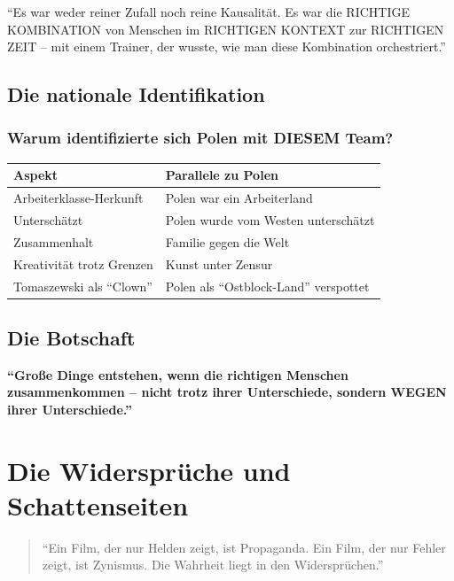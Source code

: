 \documentclass[11pt,a4paper]{book}
\newenvironment{thesenbox}{%
  \begin{mdframed}[
    linecolor=polishred,
    linewidth=2pt,
    backgroundcolor=polishred!5,
    innertopmargin=15pt,
    innerbottommargin=15pt
  ]
  \centering\large\itshape
}{%
  \end{mdframed}
}
\newenvironment{kontextbox}{%
  \begin{mdframed}[
    linecolor=polishred,
    linewidth=1pt,
    backgroundcolor=white,
    leftmargin=20pt,
    rightmargin=20pt
  ]
}{%
  \end{mdframed}
}
\begin{document}
\begin{thesenbox}
``Es war weder reiner Zufall noch reine Kausalität. Es war die RICHTIGE KOMBINATION von Menschen im RICHTIGEN KONTEXT zur RICHTIGEN ZEIT -- mit einem Trainer, der wusste, wie man diese Kombination orchestriert.''
\end{thesenbox}

\section{Die nationale Identifikation}

\subsection{Warum identifizierte sich Polen mit DIESEM Team?}

\begin{longtable}{L{4cm}L{9cm}}
\toprule
\textbf{Aspekt} & \textbf{Parallele zu Polen} \\
\midrule
\endhead
Arbeiterklasse-Herkunft & Polen war ein Arbeiterland \\
Unterschätzt & Polen wurde vom Westen unterschätzt \\
Zusammenhalt & Familie gegen die Welt \\
Kreativität trotz Grenzen & Kunst unter Zensur \\
Tomaszewski als ``Clown'' & Polen als ``Ostblock-Land'' verspottet \\
\bottomrule
\end{longtable}

\section{Die Botschaft}

\begin{kontextbox}
\textbf{``Große Dinge entstehen, wenn die richtigen Menschen zusammenkommen -- nicht trotz ihrer Unterschiede, sondern WEGEN ihrer Unterschiede.''}
\end{kontextbox}


\chapter{Die Widersprüche und Schattenseiten}

\begin{quote}
``Ein Film, der nur Helden zeigt, ist Propaganda. Ein Film, der nur Fehler zeigt, ist Zynismus. Die Wahrheit liegt in den Widersprüchen.''
\end{quote}
\end{document}
